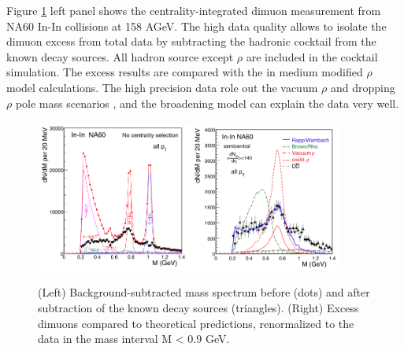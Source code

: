Figure \ref{fig:NA60dimuon} left panel shows the centrality-integrated
dimuon measurement from NA60 In-In collisions at 158 AGeV. The high
data quality allows to isolate the dimuon excess from total data by
subtracting the hadronic cocktail from the known decay sources. All
hadron source except $\rho$ are included in the cocktail simulation.
The excess results are compared with the in medium modified $\rho$
model calculations. The high precision data role out the vacuum $\rho$
and dropping $\rho$ pole mass scenarios \cite{Brown200285}, and
the broadening model \cite{R.-Rapp:2000uq} can explain the data very
well. 

\begin{figure}
\begin{centering}
\includegraphics[width=0.45\textwidth]{fig/1.Introduction/NA60_dimuon_spec}\includegraphics[width=0.45\textwidth]{fig/1.Introduction/NA60_dimuon}
\par\end{centering}

\protect\caption{(Left) Background-subtracted mass spectrum before (dots) and after
subtraction of the known decay sources (triangles). (Right) Excess
dimuons compared to theoretical predictions, renormalized to the data
in the mass interval M < 0.9 GeV. \cite{Arnaldi:2009fk}}


\label{fig:NA60dimuon}
\end{figure}


